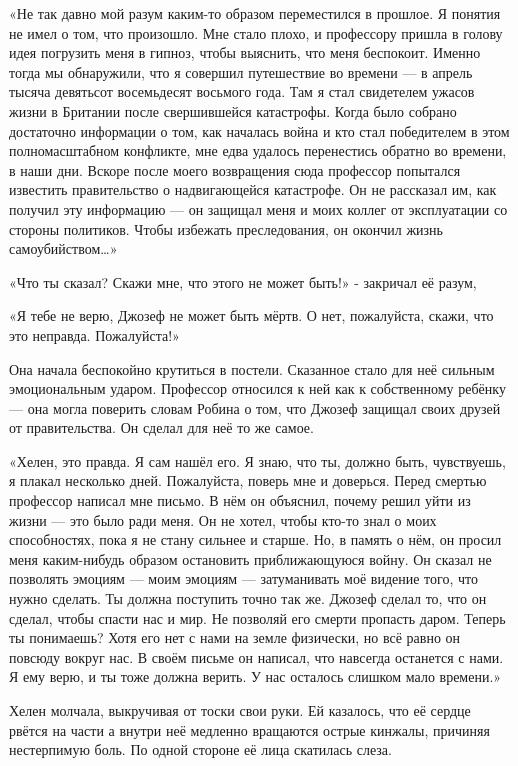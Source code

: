 \documentclass[a5paper, 9pt,
final, openany, twoside=true]{memoir}
\begin{document}
«Не так давно мой разум каким-то образом переместился в прошлое. Я понятия не имел о том, что произошло. Мне стало плохо, и профессору пришла в голову идея погрузить меня в гипноз, чтобы выяснить, что меня беспокоит. Именно тогда мы обнаружили, что я совершил путешествие во времени — в апрель тысяча девятьсот восемьдесят восьмого года. Там я стал свидетелем ужасов жизни в Британии после свершившейся катастрофы. Когда было собрано достаточно информации о том, как началась война и кто стал победителем в этом полномасштабном конфликте, мне едва удалось перенестись обратно во времени, в наши дни. Вскоре после моего возвращения сюда профессор попытался известить правительство о надвигающейся катастрофе. Он не рассказал им, как получил эту информацию — он защищал меня и моих коллег от эксплуатации со стороны политиков. Чтобы избежать преследования, он окончил жизнь самоубийством…»

«Что ты сказал? Скажи мне, что этого не может быть!» - закричал её разум,

«Я тебе не верю, Джозеф не может быть мёртв. О нет, пожалуйста, скажи, что это неправда. Пожалуйста!»

Она начала беспокойно крутиться в постели. Сказанное стало для неё сильным эмоциональным ударом. Профессор относился к ней как к собственному ребёнку — она могла поверить словам Робина о том, что Джозеф защищал своих друзей от правительства. Он сделал для неё то же самое.

«Хелен, это правда. Я сам нашёл его. Я знаю, что ты, должно быть, чувствуешь, я плакал несколько дней. Пожалуйста, поверь мне и доверься. Перед смертью профессор написал мне письмо. В нём он объяснил, почему решил уйти из жизни — это было ради меня. Он не хотел, чтобы кто-то знал о моих способностях, пока я не стану сильнее и старше. Но, в память о нём, он просил меня каким-нибудь образом остановить приближающуюся войну. Он сказал не позволять эмоциям — моим эмоциям — затуманивать моё видение того, что нужно сделать. Ты должна поступить точно так же. Джозеф сделал то, что он сделал, чтобы спасти нас и мир. Не позволяй его смерти пропасть даром. Теперь ты понимаешь? Хотя его нет с нами на земле физически, но всё равно он повсюду вокруг нас. В своём письме он написал, что навсегда останется с нами. Я ему верю, и ты тоже должна верить. У нас осталось слишком мало времени.»

Хелен молчала, выкручивая от тоски свои руки. Ей казалось, что её сердце рвётся на части а внутри неё медленно вращаются острые кинжалы, причиняя нестерпимую боль. По одной стороне её лица скатилась слеза.
\end{document}
